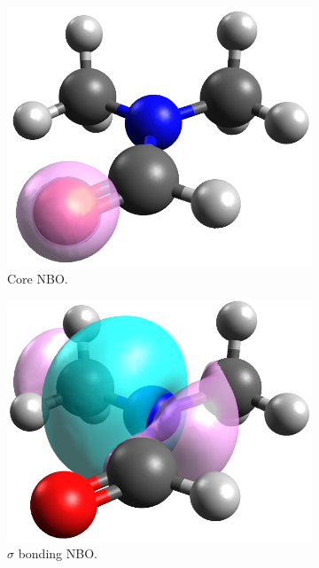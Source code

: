 \begin{refsection}
\begin{figure}
    \centering
    \begin{subfigure}{0.3\linewidth}
        \includegraphics[width=\linewidth]{Figures/dmfnbo-core.png}
        \caption{Core NBO.}
    \end{subfigure}
    \begin{subfigure}{0.3\linewidth}
        \includegraphics[width=\linewidth]{Figures/dmfnbo-sigma.png}
        \caption{$ \sigma $ bonding NBO.}
    \end{subfigure}
    \begin{subfigure}{0.3\linewidth}

\end{subfigure}
\end{figure}
\end{refsection}
